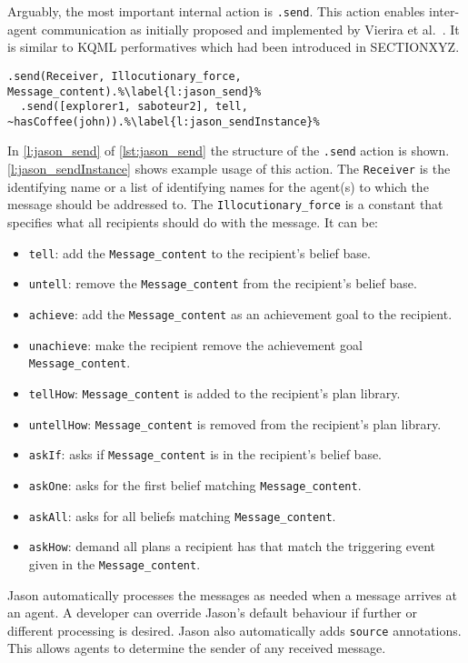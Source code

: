 Arguably, the most important  internal action is \texttt{.send}. This action enables inter-agent communication as initially proposed and implemented by Vierira et al.~\cite{vieira_formal_2007}. It is similar to KQML performatives which had been introduced in SECTIONXYZ. %
\begin{lstlisting}[caption={Parameters of the internal action \texttt{.send} and an example.}, label=lst:jason_send]
  .send(Receiver, Illocutionary_force, Message_content).%\label{l:jason_send}%
  .send([explorer1, saboteur2], tell, ~hasCoffee(john)).%\label{l:jason_sendInstance}%
\end{lstlisting}
In \autoref{l:jason_send} of \autoref{lst:jason_send} the structure of the \texttt{.send} action is shown. \autoref{l:jason_sendInstance} shows example usage of this action. The \texttt{Receiver} is the identifying name or a list of identifying names for the agent(s) to which the message should be addressed to. The \texttt{Illocutionary\_force} is a constant that specifies what all recipients should do with the message. It can be:
\begin{itemize}
  \item \texttt{tell}: add the \texttt{Message\_content} to the recipient's belief base.
  \item \texttt{untell}: remove the \texttt{Message\_content} from the recipient's belief base.
  \item \texttt{achieve}: add the \texttt{Message\_content} as an achievement goal to the recipient.
  \item \texttt{unachieve}: make the recipient remove the achievement goal \texttt{Message\_content}.
  \item \texttt{tellHow}: \texttt{Message\_content} is added to the recipient's plan library.
  \item \texttt{untellHow}: \texttt{Message\_content} is removed from the recipient's plan library.
  \item \texttt{askIf}: asks if \texttt{Message\_content} is in the recipient's belief base.
  \item \texttt{askOne}: asks for the first belief matching \texttt{Message\_content}.
  \item \texttt{askAll}: asks for all beliefs matching \texttt{Message\_content}.
  \item \texttt{askHow}: demand all plans a recipient has that match the triggering event given in the \texttt{Message\_content}.
\end{itemize}
Jason automatically processes the messages as needed when a message arrives at an agent. %
A developer can override Jason's default behaviour if further or different processing is desired. Jason also automatically adds \texttt{source} annotations. This allows agents to determine the sender of any received message.

